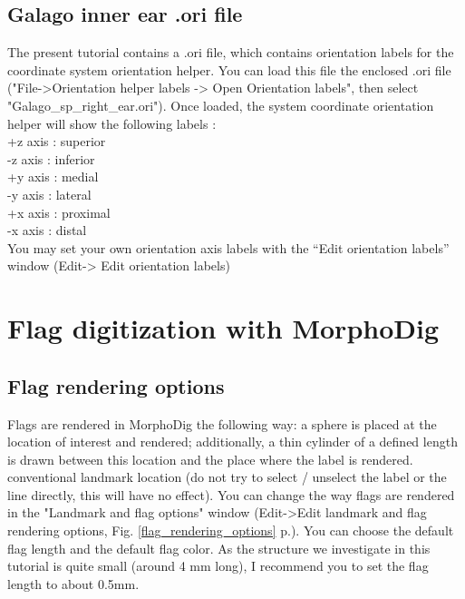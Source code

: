 \documentclass[12pt, a4paper]{book}
\begin{document}
\subsection{Galago inner ear .ori file}
The present tutorial contains a .ori file, which contains orientation labels for the coordinate system
orientation helper. You can load this file the enclosed .ori file ("File->Orientation helper labels -> Open Orientation labels", then select
"Galago\_sp\_right\_ear.ori"). Once loaded, the system coordinate orientation helper will show the following
labels :\\
+z axis : superior\\
-z axis : inferior\\
+y axis : medial\\
-y axis : lateral\\
+x axis : proximal\\
-x axis : distal\\
You may set your own orientation axis labels with the “Edit orientation labels” window (Edit-> Edit orientation labels)

\section{Flag digitization with MorphoDig}


\subsection{Flag rendering options}
Flags are rendered in MorphoDig the following way: a sphere is placed at the location of interest and rendered; additionally, a thin cylinder of a defined length is drawn between this location and the place where the label is rendered. 
conventional landmark location (do not try to select / unselect the label or the line directly, this will
have no effect).
You can change the way flags are rendered in the "Landmark and flag options" window
(Edit->Edit landmark and flag rendering options, Fig. \ref{flag_rendering_options} p.\pageref{flag_rendering_options}). You can choose the default flag length and the default flag color. As the structure we investigate in this tutorial is quite small (around 4 mm long), I recommend you to set the flag length to about 0.5mm.
\end{document}

